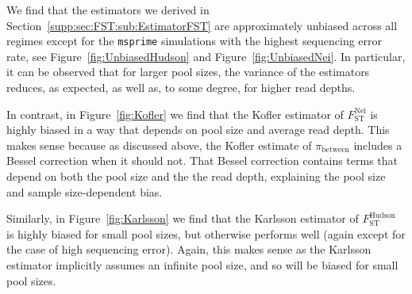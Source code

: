 \documentclass[a4paper,fontsize=9pt,DIV=14]{scrartcl}
\newcommand\figref[1]{Figure~\ref{#1}}
\newcommand{\neifst}{F_\text{ST}^\text{Nei}}
\newcommand{\hudsonfst}{F_\text{ST}^\text{Hudson}}
\begin{document}
We find that the estimators we derived in Section~\ref{supp:sec:FST:sub:EstimatorFST} are approximately unbiased across all regimes except for the \texttt{msprime} simulations with the highest sequencing error rate, see \figref{fig:UnbiasedHudson} and \figref{fig:UnbiasedNei}. In particular, it can be observed that for larger pool sizes, the variance of the estimators reduces, as expected, as well as, to some degree, for higher read depths.

In contrast, in \figref{fig:Kofler} we find that the Kofler estimator of $\neifst$ is highly biased in a way that depends on pool size and average read depth.  This makes sense because as discussed above, the Kofler estimate of $\pi_\text{between}$ includes a Bessel correction when it should not.  That Bessel correction contains terms that depend on both the pool size and the the read depth, explaining the pool size and sample size-dependent bias.

Similarly, in \figref{fig:Karlsson} we find that the Karlsson estimator of $\hudsonfst$ is highly biased for small pool sizes, but otherwise performs well (again except for the case of high sequencing error).  Again, this makes sense as the Karlsson estimator implicitly assumes an infinite pool size, and so will be biased for small pool sizes.
\end{document}
